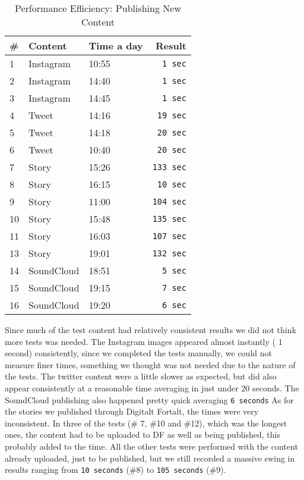 \begin{table}[!htp]
\begin{center}
	\begin{tabular}{ | l | l | l | r | }
	\hline
	 \#	 	& Content 		& Time a day 		& Result \\ \hline
	 1		&Instagram		& 10:55			& \texttt{1 sec} \\ \hline
	 2		&Instagram		& 14:40			& \texttt{1 sec} \\ \hline
	 3		&Instagram		& 14:45			& \texttt{1 sec} \\ \hline
	 4		&Tweet		& 14:16			& \texttt{19 sec} \\ \hline
	 5		&Tweet		& 14:18			& \texttt{20 sec} \\ \hline
	 6		&Tweet		& 10:40			& \texttt{20 sec} \\ \hline
	 7		&Story		& 15:26			& \texttt{133 sec}\\ \hline
	 8		&Story		& 16:15			& \texttt{10 sec}\\ \hline
	 9		&Story 		& 11:00			& \texttt{104 sec}\\ \hline
	 10		&Story		& 15:48			& \texttt{135 sec}\\ \hline
	 11		&Story		& 16:03			& \texttt{107 sec}\\ \hline
	 13		&Story		& 19:01			& \texttt{132 sec}\\ \hline
	 14		&SoundCloud		& 18:51			& \texttt{5 sec}\\ \hline
	 15		&SoundCloud		& 19:15			& \texttt{7 sec}\\ \hline
	 16		&SoundCloud		& 19:20			& \texttt{6 sec}\\  
	 \hline
 	 \end{tabular}
\end{center}
\caption{Performance Efficiency: Publishing New Content}
\label{tab:Performance Efficiency: Publishing New Content}
\end{table}

Since much of the test content had relatively consistent results we did not think more tests was needed. The Instagram images appeared almost instantly ( 1 second) consistently, since we completed the tests manually, we could not measure finer times, something we thought was not needed due to the nature of the tests. The twitter content were a little slower as expected, but did also appear consistently at a reasonable time averaging in just under 20 seconds. The SoundCloud publishing also happened pretty quick averaging \texttt{6 seconds} As for the stories we published through Digitalt Fortalt, the times were very inconsistent. In three of the tests (\# 7, \#10 and \#12), which was the longest ones, the content had to be uploaded to DF as well as being published, this probably added to the time. All the other tests were performed with the content already uploaded, just to be published, but we still recorded a massive swing in results ranging from \texttt{10 seconds} (\#8) to \texttt{105 seconds} (\#9).



